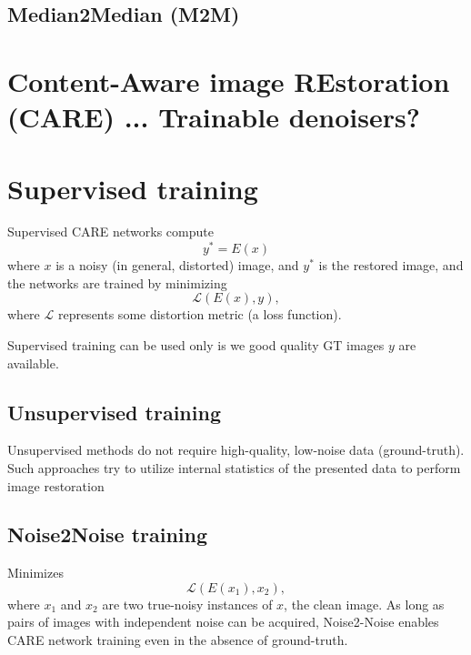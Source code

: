 \section{Median2Median (M2M)}

\chapter{Content-Aware image REstoration (CARE) ... Trainable denoisers?}



\chapter{Supervised training}

Supervised CARE networks compute
\begin{equation}
  y^* = E(x)
\end{equation}
where $x$ is a noisy (in general, distorted) image, and $y^*$ is the restored image, and the networks are trained by minimizing
\begin{equation}
  \mathcal{L}(E(x), y),
\end{equation}
where $\mathcal{L}$ represents some distortion metric (a loss
function). %

Supervised training can be used only is we good quality GT images $y$
are
available. %

\section{Unsupervised training}

Unsupervised methods do not require high-quality, low-noise data
(ground-truth).  Such approaches try to utilize internal statistics of
the presented data to perform image
restoration %

\section{Noise2Noise training}


Minimizes
\begin{equation}
  {\mathcal L}(E(x_1),x_2),
\end{equation}
where $x_1$ and $x_2$ are two true-noisy instances of $x$, the clean
image. As long as pairs of images with independent noise can be
acquired, Noise2-Noise enables CARE network training even in the
absence of ground-truth. %


